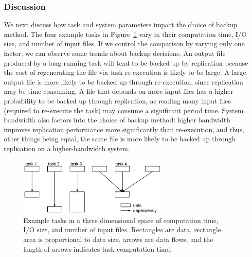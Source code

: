 \documentclass{sig-alternate}
\newcommand{\iannote}[1]{ {\textcolor{red}    { ***Ian:      #1 }}}
\newcommand{\katznote}[1]{ {\textcolor{blue}    { ***Dan:      #1 }}}
\newcommand{\zhaonote}[1]{{\textcolor{cyan}    { ***Zhao:      #1 }}}
\newcommand{\kylenote}[1]{{\textcolor{orange}    { ***Kyle:      #1 }}}
\newcommand{\iannote}[1]{}
\newcommand{\katznote}[1]{}
\newcommand{\zhaonote}[1]{}
\newcommand{\kylenote}[1]{}
\begin{document}
\subsubsection{Discussion}
We next discuss how task and system parameters impact the choice of backup method.
The four example tasks in Figure~\ref{fig:taxonomy} vary in their computation time, I/O size, and number of input files. If we control the comparison by varying only one factor, we can observe some trends about backup decisions.
An output file produced by a long-running task will tend to be backed up by replication because the cost of regenerating the file via task re-execution is likely to be large.
A large output file is more likely to be backed up through re-execution, since replication may be time consuming.
A file that depends on more input files has a higher probability to be backed up through replication, as reading many input files (required to re-execute the task) may consume a significant period time.
%
System bandwidth also factors into the choice of backup method:
higher bandwidth improves replication performance more significantly than re-execution, and thus, other things being equal, the same file is more likely to be backed up through replication on a higher-bandwidth system.

\begin{figure}[ht]
	\begin{center}
		\includegraphics[width=75mm]{pictures/task-taxonomy}
		\caption{Example tasks in a three dimensional space of computation time, I/O size, and number of input files. Rectangles are data, rectangle area is proportional to data size, arrows are data flows, and the length of arrows indicates task computation time.
		\label{fig:taxonomy}}
  	\end{center}
\end{figure}
\end{document}
